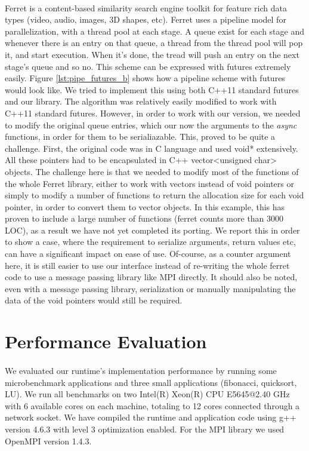 \paragraph{}
Ferret is a content-based similarity search engine toolkit for feature rich
data types (video, audio, images, 3D shapes, etc).
Ferret uses a pipeline model for parallelization, 
with a thread pool at each stage.  A queue exist for each stage and whenever
there is an entry on that queue, a thread from the thread pool will pop it, and start execution.  When it's
done, the tread will push an entry on the next stage's queue and so no.  This scheme can be expressed with
futures extremely easily.  Figure \ref{lst:pipe_futures_b} shows how a pipeline scheme with futures would 
look like.  We tried to implement this using both C++11 standard futures and our library.  The algorithm
was relatively easily modified to work with C++11 standard futures.  However, in order to work with our
version, we needed to modify the original queue entries, which our now the arguments to the \emph{async}
functions, in order for them to be serialiazable.  This, proved to be quite a challenge.  First, the original
code was in C language and used void* extensively.  All these pointers had to be encapsulated in 
C++ vector<unsigned char> objects.  The challenge here is that we needed to modify most of the functions
of the whole Ferret library, either to work with vectors instead of void pointers or simply to modify a 
number of functions to return the allocation size for each void pointer, in order to convert 
them to vector objects.  In this example, this has proven to include a large number of functions (ferret
counts more than 3000 LOC), as a result we have not yet completed its porting.  We report this in order
to show a case, where the requirement to serialize arguments, return values etc, can have a significant
impact on ease of use.  Of-course, as a counter argument here, it is still easier to 
use our interface instead of re-writing the whole ferret code to use a message passing library like MPI
directly.  It should also be noted, even with a message passing library, serialization or manually
manipulating the data of the void pointers would still be required.  

  
\section{Performance Evaluation}
\label{sect:eval_intro}
\paragraph{}
	We evaluated our runtime's implementation performance by running some microbenchmark applications and
three small applications (fibonacci, quicksort, LU).  We run all benchmarks on two Intel(R) Xeon(R) 
CPU E5645@2.40 GHz with 6 available cores on each machine, totaling to 12 cores connected through 
a network socket. We have compiled the runtime and application code using g++ version 4.6.3 with 
level 3 optimization enabled.  For the MPI library we used OpenMPI version 1.4.3.

